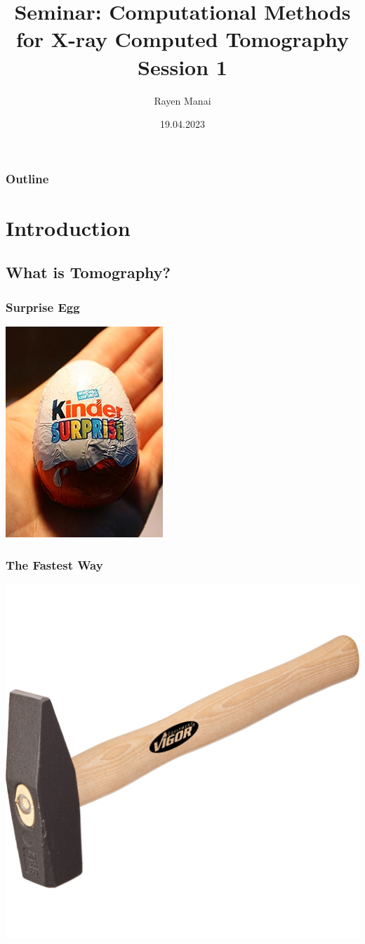 \documentclass{beamer}
\title[Introduction to CT]{
	\Large Seminar: Computational Methods for X-ray Computed Tomography \\
	[5mm] \normalsize Session 1 \\
}
\author{Rayen Manai}
\institute[]{
    TU München
}
\date{19.04.2023}
\begin{document}
\begin{frame}
	\titlepage
\end{frame}

\begin{frame}
	\frametitle{Outline}
	\tableofcontents
\end{frame}

\section{Introduction}
\subsection{What is Tomography?}
\begin{frame}
	\frametitle{Surprise Egg}

\center	
	\includegraphics[scale=0.5]{media/kinder_egg.jpg}
\end{frame}
\begin{frame}
\frametitle{The Fastest Way}
\center
\includegraphics[scale=0.05]{media/hammer.jpg}
\end{frame}
\end{document}
